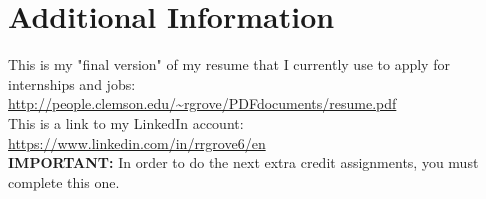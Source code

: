 \documentclass[paper=a4, fontsize=11pt]{scrartcl} %
\numberwithin{equation}{section} %
\numberwithin{figure}{section} %
\numberwithin{table}{section} %
\begin{document}
\section*{\textbf{Additional Information}}

This is my "final version" of my resume that I currently use to apply for internships and jobs:\\
\url{http://people.clemson.edu/~rgrove/PDFdocuments/resume.pdf}\\

This is a link to my LinkedIn account:\\
\url{https://www.linkedin.com/in/rrgrove6/en}\\

\textbf{IMPORTANT:} In order to do the next extra credit assignments, you must complete this one.


\end{document}
